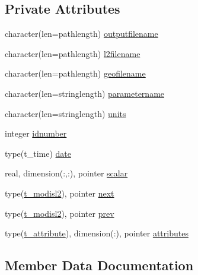 \subsection*{Private Attributes}
\begin{DoxyCompactItemize}
\item 
character(len=pathlength) \mbox{\hyperlink{structmoduleconvertmodisl2_1_1t__modisl2_ad22bb2ac228e5f64f0062dd7d576d0d7}{outputfilename}}
\item 
character(len=pathlength) \mbox{\hyperlink{structmoduleconvertmodisl2_1_1t__modisl2_a59bb3ef2e2298bd2da76825e628243dd}{l2filename}}
\item 
character(len=pathlength) \mbox{\hyperlink{structmoduleconvertmodisl2_1_1t__modisl2_ab5df4d8e98b6478a5af068b2bed70d64}{geofilename}}
\item 
character(len=stringlength) \mbox{\hyperlink{structmoduleconvertmodisl2_1_1t__modisl2_afe4c6887d89c562e8ce440596d0398bf}{parametername}}
\item 
character(len=stringlength) \mbox{\hyperlink{structmoduleconvertmodisl2_1_1t__modisl2_a1ec5c6f2126860a81d7746518b385507}{units}}
\item 
integer \mbox{\hyperlink{structmoduleconvertmodisl2_1_1t__modisl2_a27af22f83d498c1dbef80c7eae69bc4b}{idnumber}}
\item 
type(t\+\_\+time) \mbox{\hyperlink{structmoduleconvertmodisl2_1_1t__modisl2_abbfe068f97f70d1711ec59fa4ed9a1ab}{date}}
\item 
real, dimension(\+:,\+:), pointer \mbox{\hyperlink{structmoduleconvertmodisl2_1_1t__modisl2_a2e29a7a543427ef875add8b2c16c47e2}{scalar}}
\item 
type(\mbox{\hyperlink{structmoduleconvertmodisl2_1_1t__modisl2}{t\+\_\+modisl2}}), pointer \mbox{\hyperlink{structmoduleconvertmodisl2_1_1t__modisl2_a000bbe39904b0904e19df4c1a9467fb9}{next}}
\item 
type(\mbox{\hyperlink{structmoduleconvertmodisl2_1_1t__modisl2}{t\+\_\+modisl2}}), pointer \mbox{\hyperlink{structmoduleconvertmodisl2_1_1t__modisl2_a884262b605e75b6c16c8b8cb852b8f20}{prev}}
\item 
type(\mbox{\hyperlink{structmoduleconvertmodisl2_1_1t__attribute}{t\+\_\+attribute}}), dimension(\+:), pointer \mbox{\hyperlink{structmoduleconvertmodisl2_1_1t__modisl2_a3f9a783f6ac012e0a82391d8c43df054}{attributes}}
\end{DoxyCompactItemize}


\subsection{Member Data Documentation}
\mbox{\label{structmoduleconvertmodisl2_1_1t__modisl2_a3f9a783f6ac012e0a82391d8c43df054}} 
